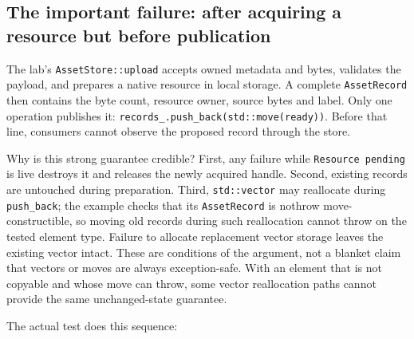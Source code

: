 \subsection{The important failure: after acquiring a resource but before publication}\label{05-engine-i-ch004-the-important-failure-after-acquiring-a-resource-but-before-publication}

The lab's \texttt{AssetStore::upload} accepts owned metadata and bytes, validates the payload, and prepares a native resource in local storage. A complete \texttt{AssetRecord} then contains the byte count, resource owner, source bytes and label. Only one operation publishes it: \texttt{records\_.push\_back(std::move(ready))}. Before that line, consumers cannot observe the proposed record through the store.

Why is this strong guarantee credible? First, any failure while \texttt{Resource\ pending} is live destroys it and releases the newly acquired handle. Second, existing records are untouched during preparation. Third, \texttt{std::vector} may reallocate during \texttt{push\_back}; the example checks that its \texttt{AssetRecord} is nothrow move-constructible, so moving old records during such reallocation cannot throw on the tested element type. Failure to allocate replacement vector storage leaves the existing vector intact. These are conditions of the argument, not a blanket claim that vectors or moves are always exception-safe. With an element that is not copyable and whose move can throw, some vector reallocation paths cannot provide the same unchanged-state guarantee.

The actual test does this sequence:

